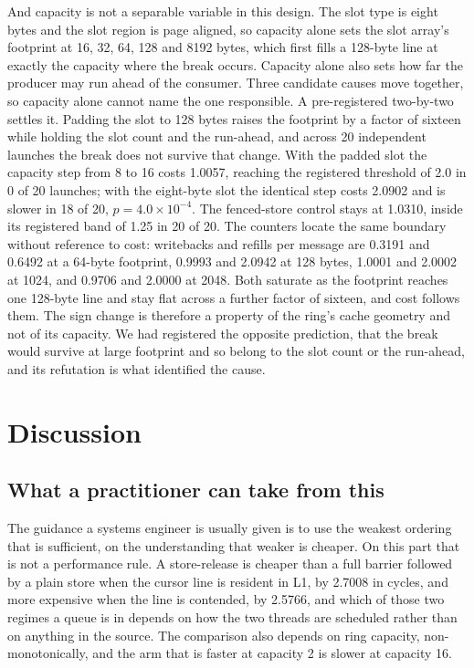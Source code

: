 \documentclass[conference]{IEEEtran}
\begin{document}
And capacity is not a separable variable in this design. The slot type is eight
bytes and the slot region is page aligned, so capacity alone sets the slot
array's footprint at 16, 32, 64, 128 and 8192 bytes, which first fills a
128-byte line at exactly the capacity where the break occurs. Capacity alone
also sets how far the producer may run ahead of the consumer. Three candidate
causes move together, so capacity alone cannot name the one responsible. A
pre-registered two-by-two settles it. Padding the slot to 128 bytes raises the
footprint by a factor of sixteen while holding the slot count and the run-ahead,
and across 20 independent launches the break does not survive that change. With
the padded slot the capacity step from 8 to 16 costs 1.0057, reaching the
registered threshold of 2.0 in 0 of 20 launches; with the eight-byte slot the
identical step costs 2.0902 and is slower in 18 of 20, $p = 4.0\times10^{-4}$.
The fenced-store control stays at 1.0310, inside its registered band of 1.25 in
20 of 20. The counters locate the same boundary without reference to cost:
writebacks and refills per message are 0.3191 and 0.6492 at a 64-byte
footprint, 0.9993 and 2.0942 at 128 bytes, 1.0001 and 2.0002 at 1024, and
0.9706 and 2.0000 at 2048. Both saturate as the footprint reaches one 128-byte
line and stay flat across a further factor of sixteen, and cost follows them.
The sign change is therefore a property of the ring's cache geometry and not of
its capacity. We had registered the opposite prediction, that the break would
survive at large footprint and so belong to the slot count or the run-ahead,
and its refutation is what identified the cause.

\section{Discussion}

\subsection{What a practitioner can take from this}

The guidance a systems engineer is usually given is to use the weakest ordering
that is sufficient, on the understanding that weaker is cheaper. On this part
that is not a performance rule. A store-release is cheaper than a full barrier
followed by a plain store when the cursor line is resident in L1, by 2.7008 in
cycles, and more expensive when the line is contended, by 2.5766, and which of
those two regimes a queue is in depends on how the two threads are scheduled
rather than on anything in the source. The comparison also depends on ring
capacity, non-monotonically, and the arm that is faster at capacity 2 is slower
at capacity 16.
\end{document}
